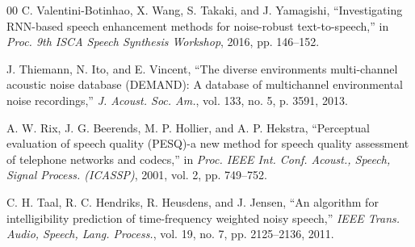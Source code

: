 \documentclass[conference]{IEEEtran}
\begin{document}
\begin{thebibliography}{00}
 C. Valentini-Botinhao, X. Wang, S. Takaki, and J. Yamagishi, ``Investigating RNN-based speech enhancement methods for noise-robust text-to-speech,'' in \emph{Proc. 9th ISCA Speech Synthesis Workshop}, 2016, pp. 146--152.

 J. Thiemann, N. Ito, and E. Vincent, ``The diverse environments multi-channel acoustic noise database (DEMAND): A database of multichannel environmental noise recordings,'' \emph{J. Acoust. Soc. Am.}, vol. 133, no. 5, p. 3591, 2013.

 A. W. Rix, J. G. Beerends, M. P. Hollier, and A. P. Hekstra, ``Perceptual evaluation of speech quality (PESQ)-a new method for speech quality assessment of telephone networks and codecs,'' in \emph{Proc. IEEE Int. Conf. Acoust., Speech, Signal Process. (ICASSP)}, 2001, vol. 2, pp. 749--752.

 C. H. Taal, R. C. Hendriks, R. Heusdens, and J. Jensen, ``An algorithm for intelligibility prediction of time-frequency weighted noisy speech,'' \emph{IEEE Trans. Audio, Speech, Lang. Process.}, vol. 19, no. 7, pp. 2125--2136, 2011.

\end{thebibliography}
\end{document}
